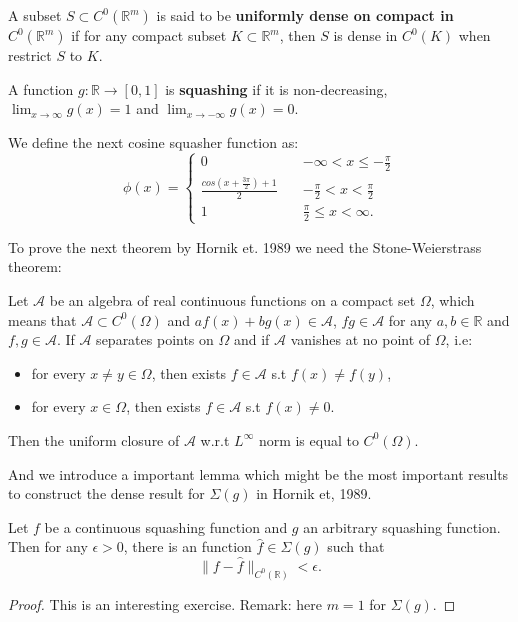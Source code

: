 \begin{definition}\label{def:udoc}
A subset $S \subset C^0(\mathbb{R}^m)$ is said to be {\bf uniformly dense on compact in $C^0(\mathbb{R}^m)$ }if for any compact subset $K \subset \mathbb{R}^m$, then $S$ is dense in $C^0(K)$ when restrict $S$ to $K$.
\end{definition}

\begin{definition}\label{def:squashing}
A function $g: \mathbb{R} \to [0,1]$ is {\bf squashing} if it is non-decreasing, $\lim_{x\to \infty}g(x) = 1$ and $\lim_{x\to -\infty} g(x) = 0$.
\end{definition}

\begin{definition}\label{def:cosine-squasher}
We define the next cosine squasher function as: 
\begin{equation}
\phi(x) = 
\begin{cases}
0 & -\infty < x \le -\frac{\pi}{2} \\
\frac{cos(x+\frac{3\pi}{2}) + 1}{2} \quad &-\frac{\pi}{2} < x < \frac{\pi}{2} \\
1 &\frac{\pi}{2} \le x < \infty. 
\end{cases}
\end{equation}
\end{definition}

To prove the next theorem by Hornik et. 1989 we need the Stone-Weierstrass theorem:
\begin{theorem}
Let $\mathcal{A}$ be an algebra of real continuous functions on a compact set $\Omega$, which means that $\mathcal{A} \subset C^0(\Omega)$ and $af(x) + bg(x) \in \mathcal{A}$, $fg \in \mathcal{A}$ for any $a, b \in \mathbb{R}$ and $f, g \in \mathcal{A}$. If $\mathcal{A}$ separates points on $\Omega$ and if $\mathcal{A}$ vanishes at no point of $\Omega$, i.e:
\begin{itemize}
\item for every $x \neq y \in \Omega$, then exists $f \in \mathcal{A}$ s.t $f(x) \neq f(y)$,
\item for every $x \in \Omega$, then exists $f \in \mathcal{A}$ s.t $f(x) \neq 0$.
\end{itemize}
Then the uniform closure of $\mathcal{A}$ w.r.t $L^{\infty}$ norm is equal to $C^{0}(\Omega)$.
\end{theorem}
 
 And we introduce a important lemma which might be the most important results to construct the dense result for $\Sigma(g)$ in Hornik et, 1989. 
 \begin{lemma}\label{lemm:squashing}
 Let $f$ be a continuous squashing function and $g$ an arbitrary squashing function. Then for any $\epsilon > 0$, there is an function $\hat{f} \in \Sigma(g)$ such that 
 $$ \|f - \hat{f} \|_{C^0(\mathbb{R})} < \epsilon .$$
 \end{lemma}
 \begin{proof}
 This is an interesting exercise. Remark: here $m = 1$ for $\Sigma(g)$.
 \end{proof}

